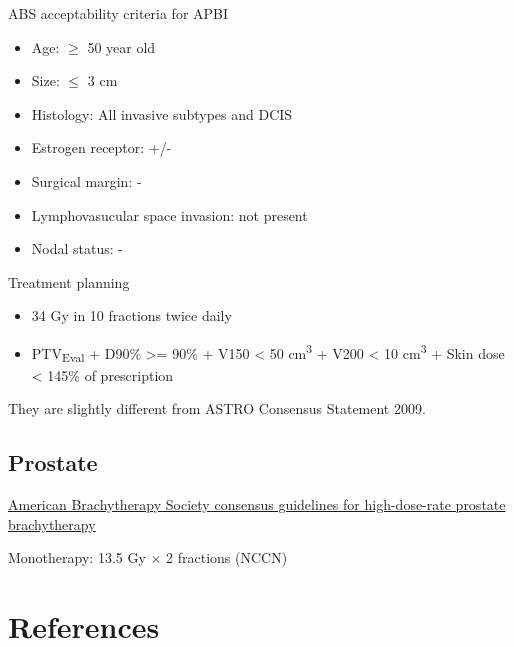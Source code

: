 \documentclass[]{book}
\providecommand{\tightlist}{%
  \setlength{\itemsep}{0pt}\setlength{\parskip}{0pt}}
\theoremstyle{definition}
\theoremstyle{definition}
\theoremstyle{definition}
\theoremstyle{remark}
\begin{document}
ABS acceptability criteria for APBI

\begin{itemize}
\tightlist
\item
  Age: \(\ge\) 50 year old
\item
  Size: \(\le\) 3 cm
\item
  Histology: All invasive subtypes and DCIS
\item
  Estrogen receptor: +/-
\item
  Surgical margin: -
\item
  Lymphovasucular space invasion: not present
\item
  Nodal status: -
\end{itemize}

Treatment planning

\begin{itemize}
\tightlist
\item
  34 Gy in 10 fractions twice daily
\item
  PTV\textsubscript{Eval} + D90\% \textgreater{}= 90\% + V150
  \textless{} 50 cm\textsuperscript{3} + V200 \textless{} 10
  cm\textsuperscript{3} + Skin dose \textless{} 145\% of prescription
\end{itemize}

They are slightly different from ASTRO Consensus Statement 2009.

\subsection{Prostate}\label{prostate}

\href{https://www.sciencedirect.com/science/article/pii/S1538472111004004}{American
Brachytherapy Society consensus guidelines for high-dose-rate prostate
brachytherapy}

Monotherapy: 13.5 Gy \(\times\) 2 fractions (NCCN)

\section{References}\label{references}
\end{document}
